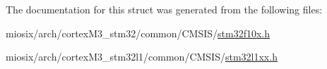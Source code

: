 The documentation for this struct was generated from the following files\-:\begin{DoxyCompactItemize}
\item 
miosix/arch/cortex\-M3\-\_\-stm32/common/\-C\-M\-S\-I\-S/\hyperlink{stm32f10x_8h}{stm32f10x.\-h}\item 
miosix/arch/cortex\-M3\-\_\-stm32l1/common/\-C\-M\-S\-I\-S/\hyperlink{stm32l1xx_8h}{stm32l1xx.\-h}\end{DoxyCompactItemize}
